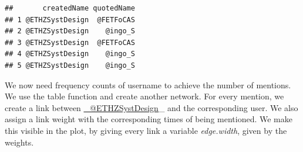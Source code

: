 \documentclass[]{article}
\newenvironment{Shaded}{\begin{snugshade}}{\end{snugshade}}
\newcommand{\KeywordTok}[1]{\textcolor[rgb]{0.13,0.29,0.53}{\textbf{{#1}}}}
\newcommand{\DataTypeTok}[1]{\textcolor[rgb]{0.13,0.29,0.53}{{#1}}}
\newcommand{\DecValTok}[1]{\textcolor[rgb]{0.00,0.00,0.81}{{#1}}}
\newcommand{\StringTok}[1]{\textcolor[rgb]{0.31,0.60,0.02}{{#1}}}
\newcommand{\OtherTok}[1]{\textcolor[rgb]{0.56,0.35,0.01}{{#1}}}
\newcommand{\NormalTok}[1]{{#1}}
\begin{document}
\begin{verbatim}
##       createdName quotedName
## 1 @ETHZSystDesign  @FETFoCAS
## 2 @ETHZSystDesign    @ingo_S
## 3 @ETHZSystDesign  @FETFoCAS
## 4 @ETHZSystDesign    @ingo_S
## 5 @ETHZSystDesign    @ingo_S
\end{verbatim}

We now need frequency counts of username to achieve the number of
mentions. We use the table function and create another network. For
every mention, we create a link between
\href{mailto:_@ETHZSystDesign}{\_@ETHZSystDesign}\_ and the
corresponding user. We also assign a link weight with the corresponding
times of being mentioned. We make this visible in the plot, by giving
every link a variable \emph{edge.width}, given by the weights.

\begin{Shaded}
\end{Shaded}
\end{document}
